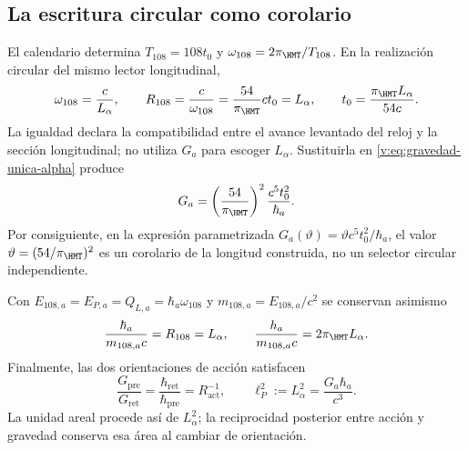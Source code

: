 \subsection{La escritura circular como corolario}

El calendario determina $T_{108}=108t_0$ y
$\omega_{108}=2\pi_{\HMT}/T_{108}$. En la realización circular del mismo
lector longitudinal,
\begin{equation}
 \omega_{108}=\frac{c}{L_\alpha},\qquad
 R_{108}=\frac{c}{\omega_{108}}
 =\frac{54}{\pi_{\HMT}}ct_0=L_\alpha,
 \qquad
 t_0=\frac{\pi_{\HMT}L_\alpha}{54c}.
 \label{v:eq:compatibilidad-reloj-longitud}
\end{equation}
La igualdad declara la compatibilidad entre el avance levantado del reloj
y la sección longitudinal; no utiliza $G_a$ para escoger $L_\alpha$.
Sustituirla en \eqref{v:eq:gravedad-unica-alpha} produce
\begin{equation}
 G_a=\left(\frac{54}{\pi_{\HMT}}\right)^2
 \frac{c^5t_0^2}{\hbar_a}.
 \label{v:eq:gravedad-circular-corolario}
\end{equation}
Por consiguiente, en la expresión parametrizada
$G_a(\vartheta)=\vartheta c^5t_0^2/\hbar_a$, el valor
$\vartheta=(54/\pi_{\HMT})^2$ es un corolario de la longitud construida,
no un selector circular independiente.

Con
$E_{108,a}=E_{P,a}=Q_{L,a}=\hbar_a\omega_{108}$ y
$m_{108,a}=E_{108,a}/c^2$ se conservan asimismo
\[
 \frac{\hbar_a}{m_{108,a}c}=R_{108}=L_\alpha,
 \qquad
 \frac{h_a}{m_{108,a}c}=2\pi_{\HMT}L_\alpha.
\]
Finalmente, las dos orientaciones de acción satisfacen
\begin{equation}
 \frac{G_{\mathrm{pre}}}{G_{\mathrm{ret}}}
 =\frac{\hbar_{\mathrm{ret}}}{\hbar_{\mathrm{pre}}}
 =R_{\mathrm{act}}^{-1},
 \qquad
 \ell_P^2:=L_\alpha^2
 =\frac{G_a\hbar_a}{c^3}.
 \label{v:eq:reciprocidad-gravedad-accion}
\end{equation}
La unidad areal procede así de $L_\alpha^2$; la reciprocidad posterior
entre acción y gravedad conserva esa área al cambiar de orientación.
